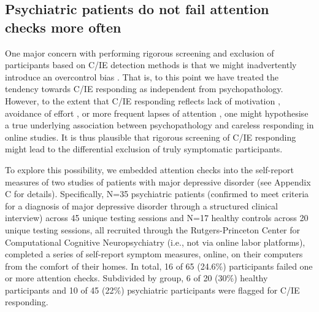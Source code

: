 \documentclass[a4paper,notitlepage,12pt]{article}
\begin{document}
\subsection*{Psychiatric patients do not fail attention checks more often}

One major concern with performing rigorous screening and exclusion of participants based on C/IE detection methods is that we might inadvertently introduce an overcontrol bias \cite{elwert2014endogenous}. That is, to this point we have treated the tendency towards C/IE responding as independent from psychopathology. However, to the extent that C/IE responding reflects lack of motivation \cite{barch2015mechanisms}, avoidance of effort \cite{cohen2001impairments, culbreth2016negative}, or more frequent lapses of attention \cite{kane2016individual, robison2017neurotic}, one might hypothesise a true underlying association between psychopathology and careless responding in online studies. It is thus plausible that rigorous screening of C/IE responding might lead to the differential exclusion of truly symptomatic participants. 

To explore this possibility, we embedded attention checks into the self-report measures of two studies of patients with major depressive disorder (see Appendix C for details). Specifically, N=35 psychiatric patients (confirmed to meet criteria for a diagnosis of major depressive disorder through a structured clinical interview) across 45 unique testing sessions and N=17 healthy controls across 20 unique testing sessions, all recruited through the Rutgers-Princeton Center for Computational Cognitive Neuropsychiatry (i.e., not via online labor platforms), completed a series of self-report symptom measures, online, on their computers from the comfort of their homes. In total, 16 of 65 (24.6\%) participants failed one or more attention checks. Subdivided by group, 6 of 20 (30\%) healthy participants and 10 of 45 (22\%) psychiatric participants were flagged for C/IE responding.
\end{document}

